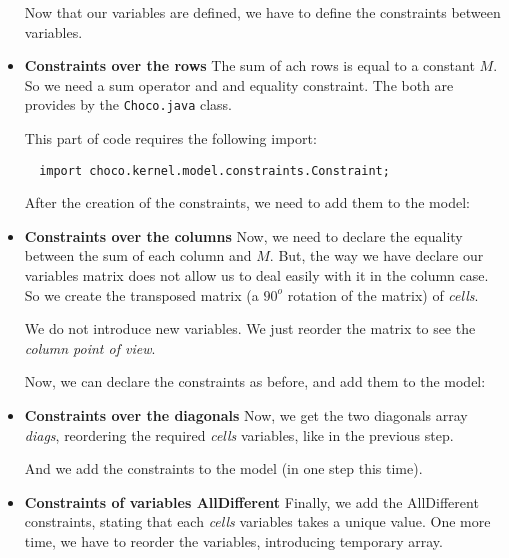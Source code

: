 \begin{itemize}
Now that our variables are defined, we have to define the constraints between variables.
\item
\textbf{Constraints over the rows}\label{gettingstarted:constraintsovertherows}\hypertarget{gettingstarted:constraintsovertherows}{}
The sum of ach rows is equal to a constant $M$.
So we need a sum operator and and equality constraint. The both are provides by the \texttt{Choco.java} class.

This part of code requires the following import:
\begin{lstlisting}
  import choco.kernel.model.constraints.Constraint;
\end{lstlisting}
After the creation of the constraints, we need to add them to the model:

\item
\textbf{Constraints over the columns}\label{gettingstarted:constraintsoverthecolumns}\hypertarget{gettingstarted:constraintsoverthecolumns}{}
Now, we need to declare the equality between the sum of each column and $M$.
But, the way we have declare our variables matrix does not allow us to deal easily with it in the column case. So we create the transposed matrix (a $90^o$ rotation of the matrix) of \emph{cells}.
\begin{note}
We do not introduce new variables. We just reorder the matrix to see the \emph{column point of view}.
\end{note}

Now, we can declare the constraints as before, and add them to the model:

\item
\textbf{Constraints over the diagonals}\label{gettingstarted:constraintsoverthediagonals}\hypertarget{gettingstarted:constraintsoverthediagonals}{}
Now, we get the two diagonals array \emph{diags}, reordering the required \emph{cells} variables, like in the previous step.


And we add the constraints to the model (in one step this time).


\item
\textbf{Constraints of variables AllDifferent}\label{gettingstarted:constraintsofvariablesalldifferent}\hypertarget{gettingstarted:constraintsofvariablesalldifferent}{}
Finally, we add the AllDifferent constraints, stating that each \emph{cells} variables takes a unique value. 
One more time, we have to reorder the variables, introducing temporary array.

\end{itemize}

